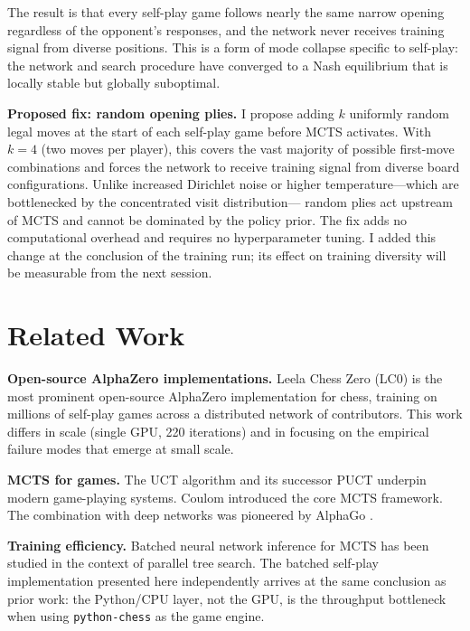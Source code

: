 \documentclass[conference]{IEEEtran}
\begin{document}
The result is that every self-play game follows nearly the same narrow opening
regardless of the opponent's responses, and the network never receives training
signal from diverse positions. This is a form of mode collapse specific to
self-play: the network and search procedure have converged to a Nash equilibrium
that is locally stable but globally suboptimal.

\textbf{Proposed fix: random opening plies.} I propose adding $k$ uniformly
random legal moves at the start of each self-play game before MCTS activates.
With $k=4$ (two moves per player), this covers the vast majority of possible
first-move combinations and forces the network to receive training signal from
diverse board configurations. Unlike increased Dirichlet noise or higher
temperature---which are bottlenecked by the concentrated visit distribution---
random plies act upstream of MCTS and cannot be dominated by the policy prior.
The fix adds no computational overhead and requires no hyperparameter tuning.
I added this change at the conclusion of the training run; its effect on
training diversity will be measurable from the next session.

\section{Related Work}

\textbf{Open-source AlphaZero implementations.} Leela Chess Zero (LC0)
\cite{lc0} is the most prominent open-source AlphaZero implementation for
chess, training on millions of self-play games across a distributed network of
contributors. This work differs in scale (single GPU, 220 iterations) and in
focusing on the empirical failure modes that emerge at small scale.

\textbf{MCTS for games.} The UCT algorithm \cite{kocsis2006bandit} and its
successor PUCT underpin modern game-playing systems. Coulom \cite{coulom2006efficient}
introduced the core MCTS framework. The combination with deep networks was
pioneered by AlphaGo \cite{silver2016mastering}.

\textbf{Training efficiency.} Batched neural network inference for MCTS has
been studied in the context of parallel tree search. The batched self-play
implementation presented here independently arrives at the same conclusion as
prior work: the Python/CPU layer, not the GPU, is the throughput bottleneck
when using \texttt{python-chess} \cite{pythonchess} as the game engine.
\end{document}
